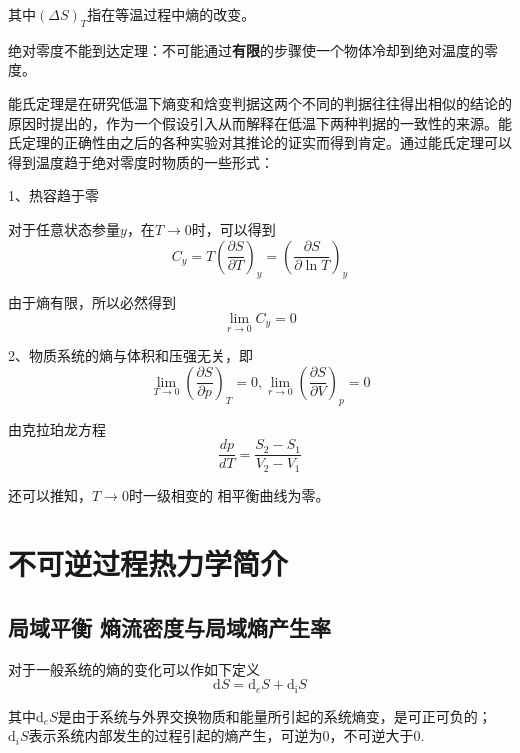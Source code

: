 \documentclass[UTF8]{ctexart}
\newcommand{\dif}{\mathrm{d}}
\begin{document}
\noindent 其中$ (\Delta S)_{T} $指在等温过程中熵的改变。

	绝对零度不能到达定理：不可能通过\textbf{有限}的步骤使一个物体冷却到绝对温度的零度。
	
	能氏定理是在研究低温下熵变和焓变判据这两个不同的判据往往得出相似的结论的原因时提出的，作为一个假设引入从而解释在低温下两种判据的一致性的来源。能氏定理的正确性由之后的各种实验对其推论的证实而得到肯定。通过能氏定理可以得到温度趋于绝对零度时物质的一些形式：
	
	1、热容趋于零
	
	对于任意状态参量$ y $，在$ T \rightarrow 0 $时，可以得到
	\begin{equation}
	C_{y}=T\left(\frac{\partial S}{\partial T}\right)_{y}=\left(\frac{\partial S}{\partial \ln T}\right)_{y}
	\end{equation}
	
\noindent 由于熵有限，所以必然得到
\begin{equation}
\lim _{r \rightarrow 0} C_{y}=0
\end{equation}

	2、物质系统的熵与体积和压强无关，即
	\begin{equation}
	\lim _{T \rightarrow 0}\left(\frac{\partial S}{\partial p}\right)_{T}=0, \lim _{r \rightarrow 0}\left(\frac{\partial S}{\partial V}\right)_{p}=0
	\end{equation}
	
\noindent 由克拉珀龙方程
\begin{equation}
\frac{d p}{d T}=\frac{S_{2}-S_{1}}{V_{2}-V_{1}}
\end{equation}

\noindent 还可以推知，$ T \rightarrow 0 $时一级相变的 相平衡曲线为零。


	\section{不可逆过程热力学简介}
	\subsection{局域平衡 \enspace 熵流密度与局域熵产生率}
	
	对于一般系统的熵的变化可以作如下定义
	\begin{equation}
	\mathrm{d} S=\mathrm{d}_{e} S+\mathrm{d}_{\mathrm{i}} S
	\end{equation}
	
\noindent 其中$ \dif_{e} S $是由于系统与外界交换物质和能量所引起的系统熵变，是可正可负的；$ \dif_{i} S $表示系统内部发生的过程引起的熵产生，可逆为0，不可逆大于0.
\end{document}

